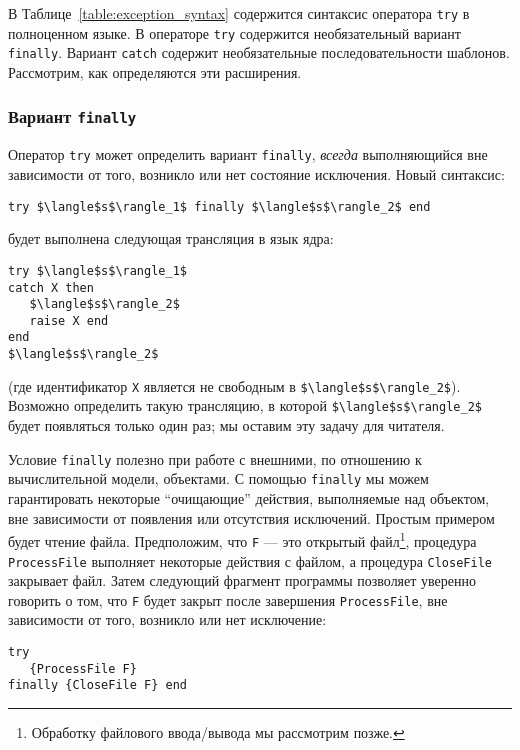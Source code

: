 В Таблице~\ref{table:exception_syntax} содержится синтаксис оператора \lstinline|try| в полноценном языке. В операторе \lstinline|try| содержится необязательный вариант \lstinline|finally|. Вариант \lstinline|catch| содержит необязательные последовательности шаблонов. Рассмотрим, как определяются эти расширения.

\subsubsection{Вариант \lstinline|finally|}

Оператор \lstinline!try! может определить вариант \lstinline!finally!, \emph{всегда} выполняющийся вне зависимости от того, возникло или нет состояние исключения. Новый синтаксис:

\begin{lstlisting}
try $\langle$s$\rangle_1$ finally $\langle$s$\rangle_2$ end
\end{lstlisting}

будет выполнена следующая трансляция в язык ядра:

\begin{lstlisting}
try $\langle$s$\rangle_1$
catch X then
   $\langle$s$\rangle_2$
   raise X end
end
$\langle$s$\rangle_2$
\end{lstlisting}

(где идентификатор \lstinline!X! является не свободным в \lstinline!$\langle$s$\rangle_2$!). Возможно определить такую трансляцию, в которой \lstinline!$\langle$s$\rangle_2$! будет появляться только один раз; мы оставим эту задачу для читателя.

Условие \lstinline!finally! полезно при работе с внешними, по отношению к вычислительной модели, объектами. С помощью \lstinline!finally! мы можем гарантировать некоторые ``очищающие'' действия, выполняемые над объектом, вне зависимости от появления или отсутствия исключений. Простым примером будет чтение файла. Предположим, что \lstinline!F! --- это открытый файл\footnote{Обработку файлового ввода/вывода мы рассмотрим позже.}, процедура \lstinline!ProcessFile! выполняет некоторые действия с файлом, а процедура \lstinline!CloseFile! закрывает файл. Затем следующий фрагмент программы позволяет уверенно говорить о том, что \lstinline!F! будет закрыт после завершения \lstinline!ProcessFile!, вне зависимости от того, возникло или нет исключение:

\begin{lstlisting}
try
   {ProcessFile F}
finally {CloseFile F} end
\end{lstlisting}

